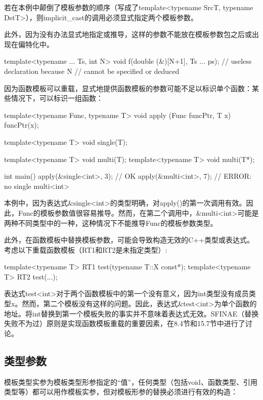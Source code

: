 若在本例中颠倒了模板参数的顺序（写成了template<typename SrcT, typename DstT>），则implicit\_cast的调用必须显式指定两个模板参数。

此外，因为没有办法显式地指定或推导，这样的参数不能放在模板参数包之后或出现在偏特化中。

\begin{cpp}
template<typename ... Ts, int N>
void f(double (&)[N+1], Ts ... ps); // useless declaration because N
// cannot be specified or deduced
\end{cpp}

因为函数模板可以重载，显式地提供函数模板的参数可能不足以标识单个函数：某些情况下，可以标识一组函数：

\begin{cpp}
template<typename Func, typename T>
void apply (Func funcPtr, T x)
{
	funcPtr(x);
}

template<typename T> void single(T);

template<typename T> void multi(T);
template<typename T> void multi(T*);

int main()
{
	apply(&single<int>, 3); // OK
	apply(&multi<int>, 7); // ERROR: no single multi<int>
}
\end{cpp}

本例中，因为表达式\&single<int>的类型明确，对apply()的第一次调用有效。因此，Func的模板参数值很容易推导。然而，在第二个调用中，\&multi<int>可能是两种不同类型中的一种，这种情况下不能推导Func的模板参数类型。

此外，在函数模板中替换模板参数，可能会导致构造无效的C++类型或表达式。考虑以下重载函数模板（RT1和RT2是未指定类型）:

\begin{cpp}
template<typename T> RT1 test(typename T::X const*);
template<typename T> RT2 test(...);
\end{cpp}

表达式test<int>对于两个函数模板中的第一个没有意义，因为int类型没有成员类型x。然而，第二个模板没有这样的问题。因此，表达式\&test<int>为单个函数的地址。将int替换到第一个模板失败的事实并不意味着表达式无效。SFINAE（替换失败不为过）原则是实现函数模板重载的重要因素，在8.4节和15.7节中进行了讨论。

\subsection{类型参数}

模板类型实参为模板类型形参指定的“值”，任何类型（包括void、函数类型、引用类型等）都可以用作模板实参，但对模板形参的替换必须进行有效的构造：

